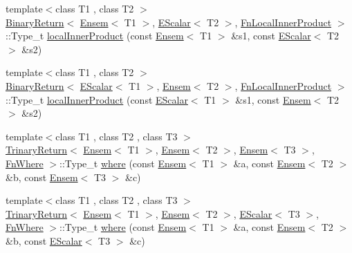 \begin{DoxyCompactItemize}
\item 
{\footnotesize template$<$class T1 , class T2 $>$ }\\\mbox{\hyperlink{structENSEM_1_1BinaryReturn}{Binary\+Return}}$<$ \mbox{\hyperlink{classENSEM_1_1Ensem}{Ensem}}$<$ T1 $>$, \mbox{\hyperlink{classENSEM_1_1EScalar}{E\+Scalar}}$<$ T2 $>$, \mbox{\hyperlink{structENSEM_1_1FnLocalInnerProduct}{Fn\+Local\+Inner\+Product}} $>$\+::Type\+\_\+t \mbox{\hyperlink{group__eensem_gabc088ed28b376f4b542a0fcd1337b609}{local\+Inner\+Product}} (const \mbox{\hyperlink{classENSEM_1_1Ensem}{Ensem}}$<$ T1 $>$ \&s1, const \mbox{\hyperlink{classENSEM_1_1EScalar}{E\+Scalar}}$<$ T2 $>$ \&s2)
\item 
{\footnotesize template$<$class T1 , class T2 $>$ }\\\mbox{\hyperlink{structENSEM_1_1BinaryReturn}{Binary\+Return}}$<$ \mbox{\hyperlink{classENSEM_1_1EScalar}{E\+Scalar}}$<$ T1 $>$, \mbox{\hyperlink{classENSEM_1_1Ensem}{Ensem}}$<$ T2 $>$, \mbox{\hyperlink{structENSEM_1_1FnLocalInnerProduct}{Fn\+Local\+Inner\+Product}} $>$\+::Type\+\_\+t \mbox{\hyperlink{group__eensem_gad3fbed60bbedae0c1abcbdbfc4bbcc0a}{local\+Inner\+Product}} (const \mbox{\hyperlink{classENSEM_1_1EScalar}{E\+Scalar}}$<$ T1 $>$ \&s1, const \mbox{\hyperlink{classENSEM_1_1Ensem}{Ensem}}$<$ T2 $>$ \&s2)
\item 
{\footnotesize template$<$class T1 , class T2 , class T3 $>$ }\\\mbox{\hyperlink{structENSEM_1_1TrinaryReturn}{Trinary\+Return}}$<$ \mbox{\hyperlink{classENSEM_1_1Ensem}{Ensem}}$<$ T1 $>$, \mbox{\hyperlink{classENSEM_1_1Ensem}{Ensem}}$<$ T2 $>$, \mbox{\hyperlink{classENSEM_1_1Ensem}{Ensem}}$<$ T3 $>$, \mbox{\hyperlink{structENSEM_1_1FnWhere}{Fn\+Where}} $>$\+::Type\+\_\+t \mbox{\hyperlink{group__eensem_gac55277f43f9b655a1ae7d4599568d633}{where}} (const \mbox{\hyperlink{classENSEM_1_1Ensem}{Ensem}}$<$ T1 $>$ \&a, const \mbox{\hyperlink{classENSEM_1_1Ensem}{Ensem}}$<$ T2 $>$ \&b, const \mbox{\hyperlink{classENSEM_1_1Ensem}{Ensem}}$<$ T3 $>$ \&c)
\item 
{\footnotesize template$<$class T1 , class T2 , class T3 $>$ }\\\mbox{\hyperlink{structENSEM_1_1TrinaryReturn}{Trinary\+Return}}$<$ \mbox{\hyperlink{classENSEM_1_1Ensem}{Ensem}}$<$ T1 $>$, \mbox{\hyperlink{classENSEM_1_1Ensem}{Ensem}}$<$ T2 $>$, \mbox{\hyperlink{classENSEM_1_1EScalar}{E\+Scalar}}$<$ T3 $>$, \mbox{\hyperlink{structENSEM_1_1FnWhere}{Fn\+Where}} $>$\+::Type\+\_\+t \mbox{\hyperlink{group__eensem_ga954917c149f91e175980e8359b2e02a2}{where}} (const \mbox{\hyperlink{classENSEM_1_1Ensem}{Ensem}}$<$ T1 $>$ \&a, const \mbox{\hyperlink{classENSEM_1_1Ensem}{Ensem}}$<$ T2 $>$ \&b, const \mbox{\hyperlink{classENSEM_1_1EScalar}{E\+Scalar}}$<$ T3 $>$ \&c)

\end{DoxyCompactItemize}
